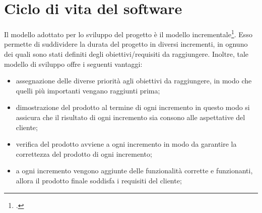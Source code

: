 

\section{Ciclo di vita del software}\label{sec:ciclo-vita-software}
Il modello adottato per lo sviluppo del progetto è il modello incrementale\footcite{womak:ingegneria-software}.
Esso permette di suddividere la durata del progetto in diversi incrementi, in ognuno dei quali sono stati definiti degli obiettivi/requisiti da raggiungere.
Inoltre, tale modello di sviluppo offre i seguenti vantaggi:
\begin{itemize}
    \item assegnazione delle diverse priorità agli obiettivi da raggiungere, in modo che quelli più importanti vengano raggiunti prima;
    \item dimostrazione del prodotto al termine di ogni incremento in questo modo si assicura che il risultato di ogni incremento sia consono alle aspettative del cliente;
    \item verifica del prodotto avviene a ogni incremento in modo da garantire la correttezza del prodotto di ogni incremento;
    \item a ogni incremento vengono aggiunte delle funzionalità corrette e funzionanti, allora il prodotto finale soddisfa i requisiti del cliente;
\end{itemize}